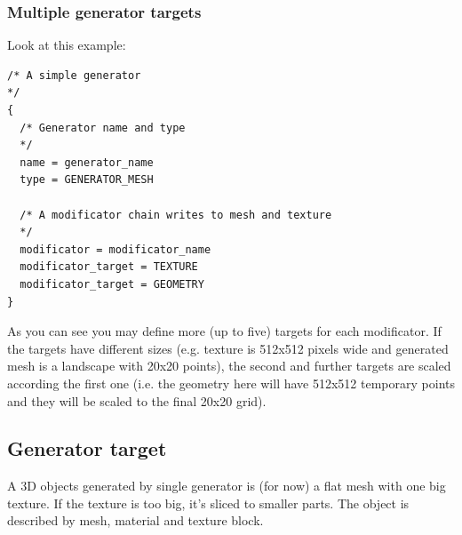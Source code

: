 \documentclass[9pt]{article}
\begin{document}
\subsubsection{Multiple generator targets}
\label{multiple_targets}

Look at this example:

\begin{verbatim}
/* A simple generator
*/
{
  /* Generator name and type
  */
  name = generator_name
  type = GENERATOR_MESH
  
  /* A modificator chain writes to mesh and texture
  */
  modificator = modificator_name
  modificator_target = TEXTURE
  modificator_target = GEOMETRY
}
\end{verbatim}

As you can see you may define more (up to five) targets for each modificator. 
If the targets have different sizes (e.g. texture is 512x512 pixels wide 
and generated mesh is a landscape with 20x20 points), the second and further 
targets are scaled according the first one (i.e. the geometry here will have 
512x512 temporary points and they will be scaled to the final 20x20 grid).

\subsection{Generator target}
A 3D objects generated by single generator is (for now) a flat mesh with
one big texture. If the texture is too big, it's sliced to smaller parts.
The object is described by mesh, material and texture block.
\end{document}
